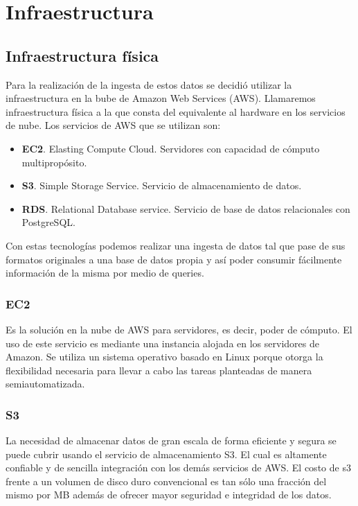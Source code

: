 \chapter{Infraestructura}
\section{Infraestructura física}
Para la realización de la ingesta de estos datos se decidió utilizar la infraestructura en la bube de Amazon Web Services (AWS). Llamaremos infraestructura física a la que consta del equivalente al hardware en los servicios de nube. Los servicios de AWS que se utilizan son:
\begin{itemize}
    \item \textbf{EC2}. Elasting Compute Cloud. Servidores con capacidad de cómputo multipropósito.
    \item \textbf{S3}. Simple Storage Service. Servicio de almacenamiento de datos.
    \item \textbf{RDS}. Relational Database service. Servicio de base de datos relacionales con PostgreSQL.
\end{itemize}
Con estas tecnologías podemos realizar una ingesta de datos tal que pase de sus formatos originales a una base de datos propia y así poder consumir fácilmente información de la misma por medio de queries.
\subsection{EC2}
Es la solución en la nube de AWS para servidores, es decir, poder de cómputo. El uso de este servicio es mediante una instancia alojada en los servidores de Amazon. Se utiliza un sistema operativo basado en Linux porque otorga la flexibilidad necesaria para llevar a cabo las tareas planteadas de manera semiautomatizada.
\subsection{S3}
La necesidad de almacenar datos de gran escala de forma eficiente y segura se puede cubrir usando el servicio de almacenamiento S3. El cual es altamente confiable y de sencilla integración con los demás servicios de AWS. El costo de s3 frente a un volumen de disco duro convencional es tan sólo una fracción del mismo por MB además de ofrecer mayor seguridad e integridad de los datos.
